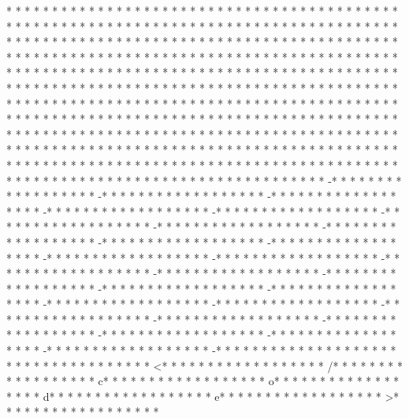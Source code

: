 * * *  * * *  * * *  *  * * *  *  * * *  * * *  * * *  *  * * *  *  * * *  * * *  * * *  *  * * *  *  * * *  *  * * *  * * *  * * *  *  * * *  *  * * *  *  * * *  * * *  * * *  *  * * *  *  * * *  *  * * *  * * *  * * *  *  * * *  *  * * *  *  * * *  * * *  * * *  *  * * *  *  * * *  *  * * *  * * *  * * *  *  * * *  *  * * *  * * *  * * *  *  * * *  *  * * *  * * *  * * *  *  * * *  *  * * *  *  * * *  * * *  * * *  *  * * *  *  * * *  *  * * *  * * *  * * *  *  * * *  *  * * *  *  * * *  * * *  * * *  *  * * *  *  * * *  *  * * *  * * *  * * *  *  * * *  *  * * *  *  * * *  * * *  * * *  *  * * *  *  * * *  * * *  * * *  *  * * *  *  * * *  * * *  * * *  *  * * *  *  * * *  *  * * *  * * *  * * *  *  * * *  *  * * *  *  * * *  * * *  * * *  *  * * *  *  * * *  *  * * *  * * *  * * *  *  * * *  *  * * *  *  * * *  * * *  * * *  *  * * *  *  * * *  *  * * *  * * *  * * *  *  * * *  *  * * *  * * *  * * *  *  * * *  *  * * *  * * *  * * *  *  * * *  *  * * *  *  * * *  * * *  * * *  *  * * *  *  * * *  *  * * *  * * *  * * *  *  * * *  *  * * *  *  * * *  * * *  * * *  *  * * *  *  * * *  *  * * *  * * *  * * *  *  * * *  *  * * *  *  * * *  * * *  * * *  *  * * *  *  * * *  * 
* * *  * * *  * * *  *  * * *  *  * * *  * -* * *  * * *  * * *  *  * * *  *  * * *  * -* * *  * * *  * * *  *  * * *  *  * * *  * -* * *  * * *  * * *  *  * * *  *  * * *  * -* * *  * * *  * * *  *  * * *  *  * * *  * -* * *  * * *  * * *  *  * * *  *  * * *  * -* * *  * * *  * * *  *  * * *  *  * * *  * -* * *  * * *  * * *  *  * * *  *  * * *  * -* * *  * * *  * * *  *  * * *  *  * * *  * -* * *  * * *  * * *  *  * * *  *  * * *  * -* * *  * * *  * * *  *  * * *  *  * * *  * -* * *  * * *  * * *  *  * * *  *  * * *  * -* * *  * * *  * * *  *  * * *  *  * * *  * -* * *  * * *  * * *  *  * * *  *  * * *  * -* * *  * * *  * * *  *  * * *  *  * * *  * -* * *  * * *  * * *  *  * * *  *  * * *  * -* * *  * * *  * * *  *  * * *  *  * * *  * -* * *  * * *  * * *  *  * * *  *  * * *  * -* * *  * * *  * * *  *  * * *  *  * * *  * -* * *  * * *  * * *  *  * * *  *  * * *  * -* * *  * * *  * * *  *  * * *  *  * * *  * -* * *  * * *  * * *  *  * * *  *  * * *  * -* * *  * * *  * * *  *  * * *  *  * * *  * -* * *  * * *  * * *  *  * * *  *  * * *  * -* * *  * * *  * * *  *  * * *  *  * * *  * -* * *  * * *  * * *  *  * * *  *  * * *  * -* * *  * * *  * * *  *  * * *  *  * * *  * 
* * *  * * *  * * *  *  * * *  *  * * *  * <* * *  * * *  * * *  *  * * *  *  * * *  * /* * *  * * *  * * *  *  * * *  *  * * *  * c* * *  * * *  * * *  *  * * *  *  * * *  * o* * *  * * *  * * *  *  * * *  *  * * *  * d* * *  * * *  * * *  *  * * *  *  * * *  * e* * *  * * *  * * *  *  * * *  *  * * *  * >* * *  * * *  * * *  *  * * *  *  * * *  * 
